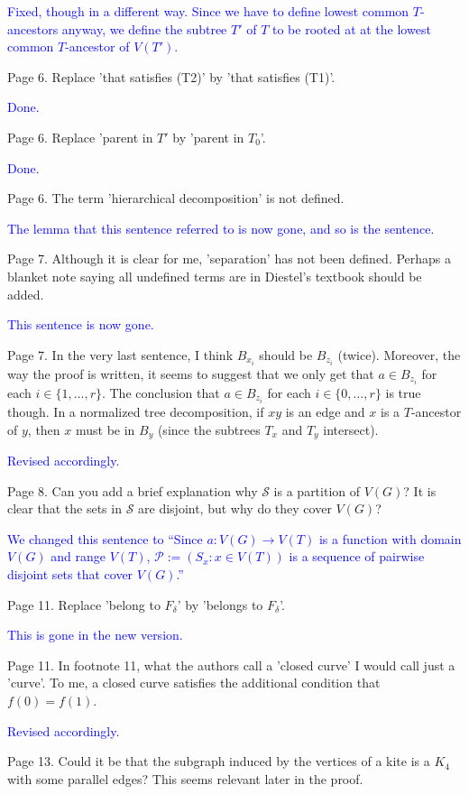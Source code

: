 \documentclass[12pt]{article}
\newcommand{\done}{\textcolor{blue}{Done.}}
\newcommand{\changed}{\textcolor{blue}{Revised accordingly.}}
\begin{document}
\textcolor{blue}{Fixed, though in a different way.  Since we have to define lowest common $T$-ancestors anyway, we define the subtree $T'$ of $T$ to be rooted at at the lowest common $T$-ancestor of $V(T')$.}

Page 6. Replace 'that satisfies (T2)' by 'that satisfies (T1)'.

\done

Page 6. Replace 'parent in $T'$ by 'parent in $T_0$'.

\done

Page 6. The term 'hierarchical decomposition' is not defined.

\textcolor{blue}{The lemma that this sentence referred to is now gone, and so is the sentence.}

Page 7. Although it is clear for me, 'separation' has not been
defined.  Perhaps a blanket note saying all undefined terms are in
Diestel's textbook should be added.

\textcolor{blue}{This sentence is now gone.}

Page 7.  In the very last sentence, I think $B_{x_i}$ should be $B_{z_i}$
(twice).  Moreover, the way the proof is written, it seems to suggest
that we only get that $a \in B_{z_i}$ for each $i \in \{1, \dots, r\}$.
The conclusion that $a \in B_{z_i}$ for each $i \in \{0, \dots, r\}$ is
true though.  In a normalized tree decomposition, if $xy$ is an edge and
$x$ is a $T$-ancestor of $y$, then $x$ must be in $B_y$ (since the subtrees $T_x$
and $T_y$ intersect).

\changed

Page 8.  Can you add a brief explanation why $\mathcal{S}$ is a
partition of $V(G)$?  It is clear that the sets in $\mathcal{S}$ are
disjoint, but why do they cover $V(G)$?

\textcolor{blue}{We changed this sentence to ``Since $a:V(G)\to V(T)$ is a function with domain $V(G)$ and range $V(T)$, $\mathcal{P}:=(S_x : x\in V(T))$ is a sequence of pairwise disjoint sets that cover $V(G)$.''}

Page 11. Replace 'belong to $F_\delta$' by 'belongs to $F_\delta$'.

\textcolor{blue}{This is gone in the new version.}

Page 11. In footnote 11, what the authors call a 'closed curve' I
would call just a 'curve'.  To me, a closed curve satisfies the
additional condition that $f(0)=f(1)$.

\changed

Page 13. Could it be that the subgraph induced by the vertices of a
kite is a $K_4$ with some parallel edges?  This seems relevant later in
the proof.
\end{document}

